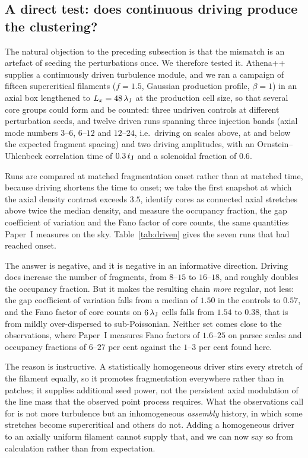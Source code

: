 \documentclass[usenatbib,twoside,twocolumn]{mnras}
\begin{document}
\subsection{A direct test: does continuous driving produce the clustering?}
\label{sec:driven}

The natural objection to the preceding subsection is that the mismatch is an artefact of seeding the perturbations once. We therefore tested it. Athena++ supplies a continuously driven turbulence module, and we ran a campaign of fifteen supercritical filaments ($f=1.5$, Gaussian production profile, $\beta=1$) in an axial box lengthened to $L_x=48\,\lambda_{\rm J}$ at the production cell size, so that several core groups could form and be counted: three undriven controls at different perturbation seeds, and twelve driven runs spanning three injection bands (axial mode numbers $3$--$6$, $6$--$12$ and $12$--$24$, i.e.\ driving on scales above, at and below the expected fragment spacing) and two driving amplitudes, with an Ornstein--Uhlenbeck correlation time of $0.3\,t_{\rm J}$ and a solenoidal fraction of $0.6$.

Runs are compared at matched fragmentation onset rather than at matched time, because driving shortens the time to onset; we take the first snapshot at which the axial density contrast exceeds $3.5$, identify cores as connected axial stretches above twice the median density, and measure the occupancy fraction, the gap coefficient of variation and the Fano factor of core counts, the same quantities Paper~I measures on the sky. Table~\ref{tab:driven} gives the seven runs that had reached onset.

The answer is negative, and it is negative in an informative direction. Driving does increase the number of fragments, from $8$--$15$ to $16$--$18$, and roughly doubles the occupancy fraction. But it makes the resulting chain \emph{more} regular, not less: the gap coefficient of variation falls from a median of $1.50$ in the controls to $0.57$, and the Fano factor of core counts on $6\,\lambda_{\rm J}$ cells falls from $1.54$ to $0.38$, that is from mildly over-dispersed to sub-Poissonian. Neither set comes close to the observations, where Paper~I measures Fano factors of $1.6$--$25$ on parsec scales and occupancy fractions of $6$--$27$ per cent against the $1$--$3$ per cent found here.

The reason is instructive. A statistically homogeneous driver stirs every stretch of the filament equally, so it promotes fragmentation everywhere rather than in patches; it supplies additional seed power, not the persistent axial modulation of the line mass that the observed point process requires. What the observations call for is not more turbulence but an inhomogeneous \emph{assembly} history, in which some stretches become supercritical and others do not. Adding a homogeneous driver to an axially uniform filament cannot supply that, and we can now say so from calculation rather than from expectation.
\end{document}
